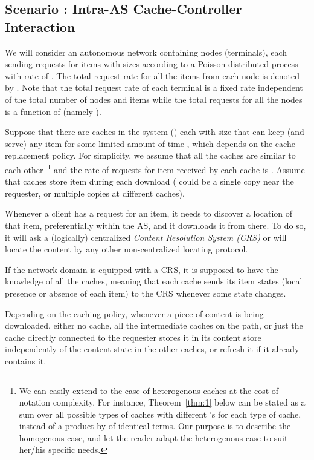 \documentclass[conference]{IEEEtran}
\theoremstyle{plain}
\theoremstyle{remark}
\begin{document}
\subsection{Scenario : Intra-AS Cache-Controller Interaction}
\label{subsec:scenario1}

We will consider an autonomous network containing  nodes (terminals), each sending requests for items  with sizes  according to a Poisson distributed process with rate of . The total request rate for all the items from each node is denoted by . Note that the total request rate of each terminal is a fixed rate independent of the total number of nodes and items while the total requests for all the nodes is a function of  (namely ).

Suppose that there are  caches in the system () each with size  that can keep (and serve) any item  for some limited amount of time , which depends on the cache replacement policy. For simplicity, we assume that all the caches are similar to each other~\footnote{We can easily extend to the case of heterogenous caches at the cost of notation complexity. For instance, Theorem~\ref{thm:1} below can be stated as a sum over all  possible types of caches with  different 's for each type of cache, instead of a product by  of identical terms. Our purpose is to describe the homogenous case, and let the reader adapt the heterogenous case to suit her/his specific needs.} and the rate of requests for item  received by each cache is . Assume that  caches store item  during each download ( could be a single copy near the requester, or multiple copies at different caches).

Whenever a client has a request for an item, it needs to discover a location of that item, preferentially within the AS, and it downloads it from there. To do so, it will ask a (logically) centralized \emph{Content Resolution System (CRS)} or will locate the content by any other non-centralized locating protocol.

If the network domain is equipped with a CRS, it is supposed to have the knowledge of all the caches, meaning that each cache sends its item states (local presence or absence of each item) to the CRS whenever some state changes. 

Depending on the caching policy, whenever a piece of content is being downloaded, either no cache, all the intermediate caches on the path, or just the cache directly connected to the requester stores it in its content store independently of the content state in the other caches, or refresh it if it already contains it.
\end{document}
